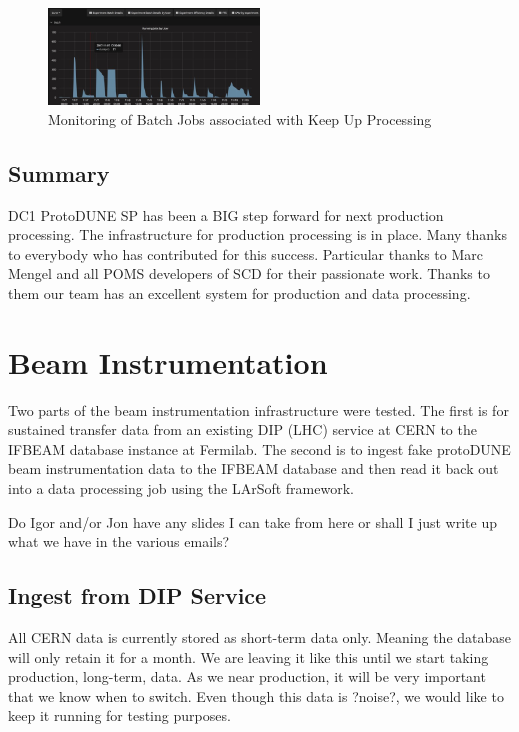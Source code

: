 \documentclass[pdftex,12pt,letter]{article}
\begin{document}
\begin{figure}[tbh]
  \centering
  \includegraphics[width=0.5\textwidth]{./ReportImages/FIFEMonkeepup.jpg}
  \caption{Monitoring of Batch Jobs associated with Keep Up Processing}
  \label{fig:FIFEmon}
\end{figure}



\subsection {Summary}

DC1 ProtoDUNE SP has been a BIG step forward for next production processing.
The infrastructure for production processing is in place.
Many thanks to everybody who has contributed for this success.
Particular thanks to Marc Mengel and all POMS developers of SCD for their passionate work. Thanks to them our team has an excellent system for production and data processing.



\section {Beam Instrumentation}

Two parts of the beam instrumentation infrastructure were tested. The first is for sustained transfer data from an existing DIP (LHC) service at CERN to the IFBEAM database instance at Fermilab. The second is to ingest fake protoDUNE beam instrumentation data to the IFBEAM database and then read it back out into a data processing job using the LArSoft framework. 

 \color{red} Do Igor and/or Jon have any slides I can take from here or shall I just write up what we have in the various emails? 
 \color{black}


\subsection {Ingest from DIP Service}

All CERN data is currently stored as short-term data only.   Meaning the database will only retain it for a month.   We are leaving it like this until we start taking production, long-term, data.   As we near production, it will be very important that we know when to switch.  Even though this data is ?noise?, we would like to keep it running for testing purposes.
\end{document}
